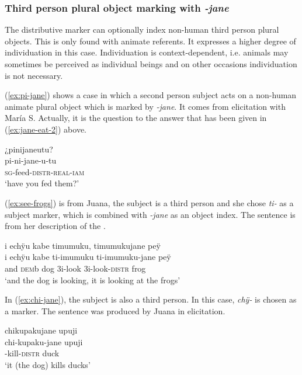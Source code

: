 \subsubsection{Third person plural object marking with \textit{-jane}} The distributive marker can optionally index non-human third person plural objects. This is only found with animate referents. It expresses a higher degree of individuation in this case. Individuation is context-dependent, i.e. animals may sometimes be perceived as individual beings and on other occasions individuation is not necessary.
 
(\ref{ex:pi-jane}) shows a case in which a second person subject acts on a non-human animate plural object which is marked by \textit{-jane}. It comes from elicitation with María S. Actually, it is the question to the answer that has been given in (\ref{ex:jane-eat-2}) above.
 
 \ea\label{ex:pi-jane}
\begingl 
\glpreamble ¿pinijaneutu?\\
\gla pi-ni-jane-u-tu\\ 
\textsc{sg}-feed-\textsc{distr}-\textsc{real}-\textsc{iam}\\ 
\glft ‘have you fed them?’
\trailingcitation{[rxx-e141230s.037]}
\xe

(\ref{ex:see-frogs}) is from Juana, the subject is a third person and she chose \textit{ti-} as a subject marker, which is combined with \textit{-jane} as an object index. The sentence is from her description of the .

\ea\label{ex:see-frogs}
\begingl
\glpreamble i echÿu kabe timumuku, timumukujane peÿ\\
\gla i echÿu kabe ti-imumuku ti-imumuku-jane peÿ\\
\glb and \textsc{dem}b dog 3i-look 3i-look-\textsc{distr} frog\\
\glft ‘and the dog is looking, it is looking at the frogs’
\endgl
\trailingcitation{[jxx-a120516l-a.429]}
\xe

In (\ref{ex:chi-jane}), the subject is also a third person. In this case, \textit{chÿ-} is chosen as a marker. The sentence was produced by Juana in elicitation.

\ea\label{ex:chi-jane}
\begingl 
\glpreamble chikupakujane upuji\\
\gla chi-kupaku-jane upuji\\ 
-kill-\textsc{distr} duck\\ 
\glft ‘it (the dog) kills ducks’
\trailingcitation{[jxx-e081025s-1.552]}
\xe



